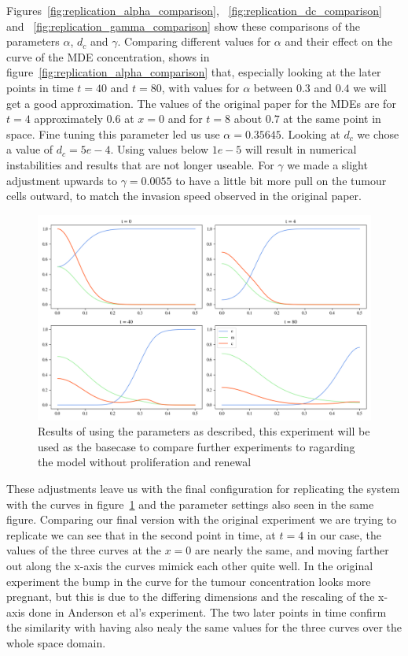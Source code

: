 Figures~\ref{fig:replication_alpha_comparison}, ~\ref{fig:replication_dc_comparison} and ~\ref{fig:replication_gamma_comparison} show these comparisons of the parameters $\alpha$, $d_c$ and $\gamma$. Comparing different values for $\alpha$ and their effect on the curve of the MDE concentration, shows in figure~\ref{fig:replication_alpha_comparison} that, especially looking at the later points in time $t=40$ and $t=80$, with values for $\alpha$ between $0.3$ and $0.4$ we will get a good approximation. The values of the original paper for the MDEs are for $t=4$ approximately $0.6$ at $x=0$ and for $t=8$ about $0.7$ at the same point in space. Fine tuning this parameter led us use $\alpha=0.35645$.\newline 
Looking at $d_c$ we chose a value of $d_c=5e-4$. Using values below $1e-5$ will result in numerical instabilities and results that are not longer useable. For $\gamma$ we made a slight adjustment upwards to $\gamma=0.0055$ to have a little bit more pull on the tumour cells outward, to match the invasion speed observed in the original paper. 
\begin{figure}[h]
    \centering
    \includegraphics[width=\textwidth]{resources/images/basecase_without_proliferation_.png}
    \caption{Results of using the parameters as described, this experiment will be used as the basecase to compare further experiments to ragarding the model without proliferation and renewal}
    \label{fig:basecase_without_proliferation}
\end{figure}

These adjustments leave us with the final configuration for replicating the system with the curves in figure~\ref{fig:basecase_without_proliferation} and the parameter settings also seen in the same figure. Comparing our final version with the original experiment we are trying to replicate we can see that in the second point in time, at $t=4$ in our case, the values of the three curves at the $x=0$ are nearly the same, and moving farther out along the x-axis the curves mimick each other quite well. In the original experiment the bump in the curve for the tumour concentration looks more pregnant, but this is due to the differing dimensions and the rescaling of the x-axis done in Anderson et al's experiment. The two later points in time confirm the similarity with having also nealy the same values for the three curves over the whole space domain.



